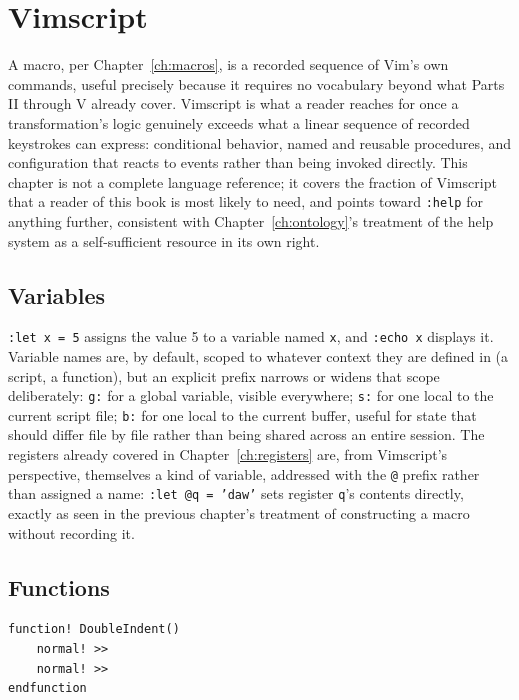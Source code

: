 \chapter{Vimscript}
\label{ch:vimscript}

A macro, per Chapter~\ref{ch:macros}, is a recorded sequence of Vim's own commands, useful precisely because it requires no vocabulary beyond what Parts II through V already cover. Vimscript is what a reader reaches for once a transformation's logic genuinely exceeds what a linear sequence of recorded keystrokes can express: conditional behavior, named and reusable procedures, and configuration that reacts to events rather than being invoked directly. This chapter is not a complete language reference; it covers the fraction of Vimscript that a reader of this book is most likely to need, and points toward \texttt{:help} for anything further, consistent with Chapter~\ref{ch:ontology}'s treatment of the help system as a self-sufficient resource in its own right.

\section{Variables}

\texttt{:let x = 5} assigns the value 5 to a variable named \texttt{x}, and \texttt{:echo x} displays it. Variable names are, by default, scoped to whatever context they are defined in (a script, a function), but an explicit prefix narrows or widens that scope deliberately: \texttt{g:} for a global variable, visible everywhere; \texttt{s:} for one local to the current script file; \texttt{b:} for one local to the current buffer, useful for state that should differ file by file rather than being shared across an entire session. The registers already covered in Chapter~\ref{ch:registers} are, from Vimscript's perspective, themselves a kind of variable, addressed with the \texttt{@} prefix rather than assigned a name: \texttt{:let @q = 'daw'} sets register \texttt{q}'s contents directly, exactly as seen in the previous chapter's treatment of constructing a macro without recording it.

\section{Functions}

\begin{lstlisting}
function! DoubleIndent()
    normal! >>
    normal! >>
endfunction
\end{lstlisting}

